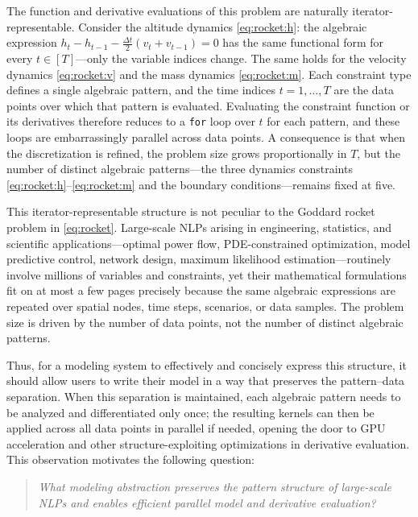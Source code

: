 \documentclass[11pt]{article}
\begin{document}
The function and derivative evaluations of this problem are naturally iterator-representable. Consider the altitude dynamics \cref{eq:rocket:h}: the algebraic expression $h_t - h_{t-1} - \tfrac{\Delta t}{2}(v_t + v_{t-1}) = 0$ has the same functional form for every $t \in [T]$---only the variable indices change. The same holds for the velocity dynamics \cref{eq:rocket:v} and the mass dynamics \cref{eq:rocket:m}. Each constraint type defines a single algebraic pattern, and the time indices $t = 1, \ldots, T$ are the data points over which that pattern is evaluated. Evaluating the constraint function or its derivatives therefore reduces to a \texttt{for} loop over $t$ for each pattern, and these loops are embarrassingly parallel across data points. A consequence is that when the discretization is refined, the problem size grows proportionally in $T$, but the number of distinct algebraic patterns---the three dynamics constraints \cref{eq:rocket:h}--\cref{eq:rocket:m} and the boundary conditions---remains fixed at five.

This iterator-representable structure is not peculiar to the Goddard rocket problem in \cref{eq:rocket}. Large-scale NLPs arising in engineering, statistics, and scientific applications---optimal power flow, PDE-constrained optimization, model predictive control, network design, maximum likelihood estimation---routinely involve millions of variables and constraints, yet their mathematical formulations fit on at most a few pages precisely because the same algebraic expressions are repeated over spatial nodes, time steps, scenarios, or data samples. The problem size is driven by the number of data points, not the number of distinct algebraic patterns. 

Thus, for a modeling system to effectively and concisely express this structure, it should allow users to write their model in a way that preserves the pattern--data separation. When this separation is maintained, each algebraic pattern needs to be analyzed and differentiated only once; the resulting kernels can then be applied across all data points in parallel if needed, opening the door to GPU acceleration and other structure-exploiting optimizations in derivative evaluation. This observation motivates the following question: 
\begin{quote}
  \emph{What modeling abstraction preserves the pattern structure of large-scale NLPs and enables efficient parallel model and derivative evaluation? }
\end{quote}
\end{document}
